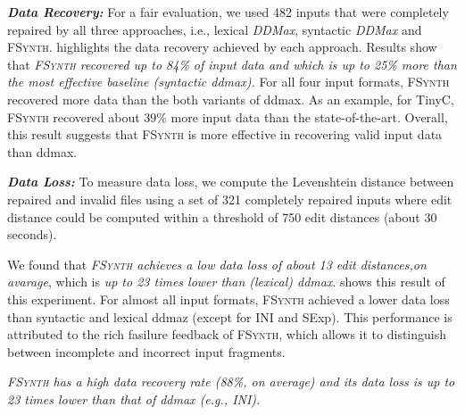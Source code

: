 \documentclass[sigconf,review,anonymous]{acmart}
\newenvironment{result}{\begin{framed}\centering\it}{\end{framed}}
\newcommand{\recheck}[1]{\textcolor{red}{#1}}
\newcommand{\approach}{\textsc{FSynth}\xspace}
\newcommand{\ddmax}{\textit{DDMax}\xspace}
\begin{document}
\noindent
\textbf{\textit{Data Recovery:}} 
For a fair evaluation, %
we used 482 inputs that were completely repaired by all three approaches, i.e., lexical \ddmax, syntactic \ddmax and \approach.  %
highlights the data %
recovery achieved by each approach. %
Results show that \textit{\approach recovered up to 84\% of input data and which is up to 25\% more than the most effective baseline (syntactic ddmax).} %
For all four input formats, \approach recovered more data than the both variants of ddmax. As an example, for TinyC, \approach recovered about 39\% more input data than the state-of-the-art.
Overall, this result suggests that \approach is more effective in recovering valid input data than ddmax.

\noindent
\textbf{\textit{Data Loss:}} To measure data loss, we compute the Levenshtein distance between repaired and invalid files using %
a set of 321 completely repaired inputs %
where edit distance could be computed within a threshold of 750 edit distances (about 30 seconds).

We found that \textit{\approach achieves a low data loss of about 13 edit distances,on avarage},  which is \textit{up to 23 times lower than (lexical) ddmax}.  shows this result of this experiment. For almost all input formats, \approach achieved a lower data loss than syntactic and lexical ddmaz (except for INI and SExp). This performance is attributed to the rich fasilure feedback of \approach, which allows it to distinguish between incomplete and incorrect input fragments.

\begin{result}
\approach has a high data recovery rate (88\%, on average) and its data %
loss is up to 23 times lower than that of ddmax (e.g., INI).
\end{result}
\end{document}
